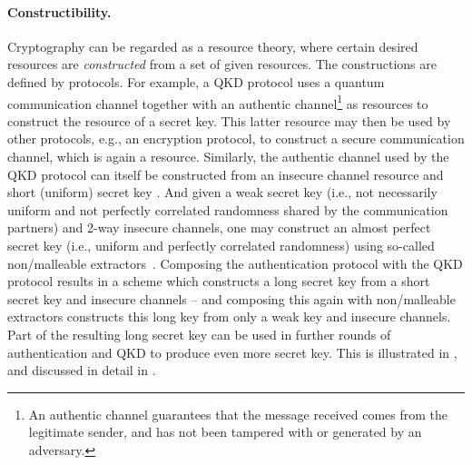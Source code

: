 \paragraph{Constructibility.}
Cryptography can be regarded as a resource theory, where certain
desired resources are \emph{constructed} from a set of given
resources. The
constructions are defined by protocols. For example, a QKD protocol
uses a quantum communication channel together with an authentic
channel\footnote{An authentic channel guarantees that the message
  received comes from the legitimate sender, and has not been tampered
  with or generated by an adversary.} as resources to construct the
resource of a secret key. This latter resource may then be used by
other protocols, e.g., an encryption protocol, to construct a secure
communication channel, which is again a resource. Similarly, the
authentic channel used by the QKD protocol can itself be constructed
from an insecure channel resource and short (uniform) secret key
\cite{WC81}. And given a weak secret key (i.e., not necessarily
uniform and not perfectly correlated randomness shared by the
communication partners) and 2-way insecure channels, one may construct
an almost perfect secret key (i.e., uniform and perfectly correlated
randomness) using so-called non\-/malleable
extractors~\cite{RW03,DW09,ACLV19}. Composing the authentication
protocol with the QKD protocol results in a scheme which constructs a
long secret key from a short secret key and insecure channels \--- and
composing this again with non\-/malleable extractors constructs this
long key from only a weak key and insecure channels. Part of the
resulting long secret key can be used in further rounds of
authentication and QKD to produce even more secret key. This is
illustrated in , and discussed in detail in
.

